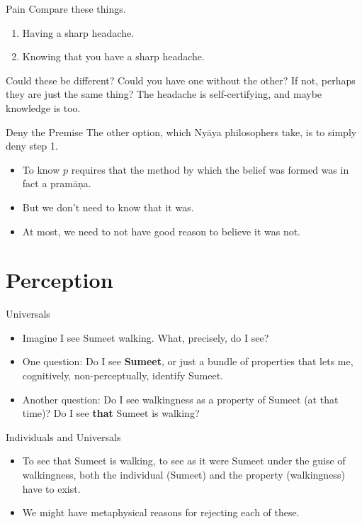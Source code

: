 \documentclass[
  17pt,
  letterpaper,
  ignorenonframetext,
  aspectratio=169,
]{beamer}
\providecommand{\tightlist}{%
  \setlength{\itemsep}{0pt}\setlength{\parskip}{0pt}}\usepackage{longtable,booktabs,array}
\begin{document}
\begin{frame}{Pain}
\protect\hypertarget{pain}{}
Compare these things.

\begin{enumerate}[<+->]
\tightlist
\item
  Having a sharp headache.
\item
  Knowing that you have a sharp headache.
\end{enumerate}

\pause Could these be different? Could you have one without the other?
If not, perhaps they are just the same thing? The headache is
self-certifying, and maybe knowledge is too.
\end{frame}

\begin{frame}{Deny the Premise}
\protect\hypertarget{deny-the-premise}{}
The other option, which Nyāya philosophers take, is to simply deny step
1.

\begin{itemize}[<+->]
\tightlist
\item
  To know \(p\) requires that the method by which the belief was formed
  was in fact a pramāṇa.
\item
  But we don't need to know that it was.
\item
  At most, we need to not have good reason to believe it was not.
\end{itemize}
\end{frame}

\hypertarget{perception}{%
\section{Perception}\label{perception}}

\begin{frame}{Universals}
\protect\hypertarget{universals}{}
\begin{itemize}[<+->]
\tightlist
\item
  Imagine I see Sumeet walking. What, precisely, do I see?
\item
  One question: Do I see \textbf{Sumeet}, or just a bundle of properties
  that lets me, cognitively, non-perceptually, identify Sumeet.
\item
  Another question: Do I see walkingness as a property of Sumeet (at
  that time)? Do I see \textbf{that} Sumeet is walking?
\end{itemize}
\end{frame}

\begin{frame}{Individuals and Universals}
\protect\hypertarget{individuals-and-universals}{}
\begin{itemize}[<+->]
\tightlist
\item
  To see that Sumeet is walking, to see as it were Sumeet under the
  guise of walkingness, both the individual (Sumeet) and the property
  (walkingness) have to exist.
\item
  We might have metaphysical reasons for rejecting each of these.
\end{itemize}
\end{frame}
\end{document}
